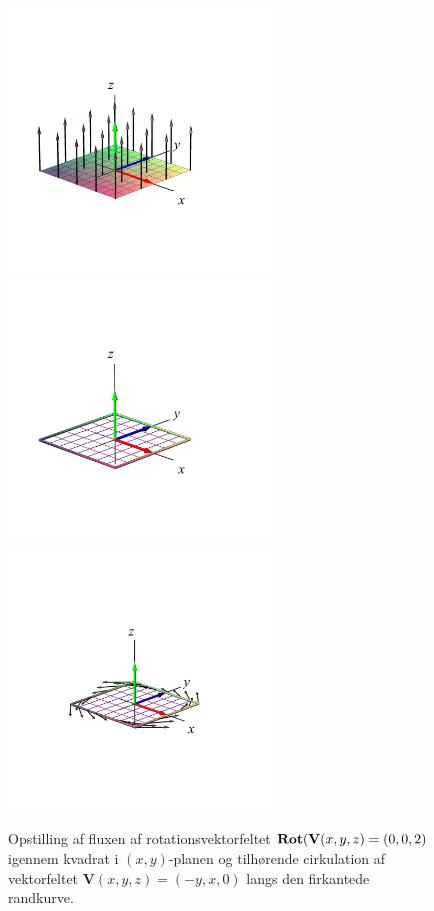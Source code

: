 \begin{figure}[h]
\centerline{\includegraphics[height=70mm]{FIGS/plotFlat4}\includegraphics[height=70mm]{FIGS/plotFlat5}\includegraphics[height=70mm]{FIGS/plotFlat6}}
\begin{center}
\caption{\small{Opstilling af fluxen af rotationsvektorfeltet $\operatorname{\mathbf{Rot}}(\mathbf{V}(x,y,z) = (0,0,2)$ igennem kvadrat i $(x,y)$-planen og tilhørende cirkulation af vektorfeltet $\mathbf{V}(x,y,z) = (-y, x, 0)$ langs den firkantede randkurve.}}
\label{figFlatStokesB}
\end{center}
\end{figure}



